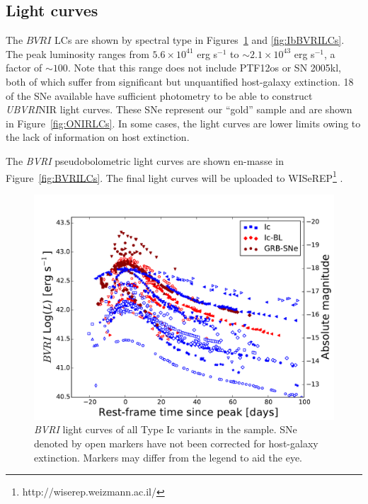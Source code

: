 \documentclass[a4paper,fleqn,usenatbib]{mnras}
\begin{document}
\subsection{Light curves}
The $BVRI$ LCs are shown by spectral type in Figures~\ref{fig:IcBVRILCs} and \ref{fig:IbBVRILCs}. The peak luminosity ranges from $5.6\times10^{41}$ erg s$^{-1}$ to $\sim 2.1 \times10^{43}$ erg s$^{-1}$, a factor of $\sim 100$. Note that this range does not include PTF12os or SN 2005kl, both of which suffer from significant but unquantified host-galaxy extinction. 18 of the SNe available have sufficient photometry to be able to construct \textit{UBVRI}NIR light curves. These SNe represent our ``gold'' sample and are shown in Figure~\ref{fig:ONIRLCs}. In some cases, the light curves are lower limits owing to the lack of information on host extinction. 

The \textit{BVRI} pseudobolometric light curves are shown en-masse in Figure~\ref{fig:BVRILCs}.
The final light curves will be uploaded to WISeREP\footnote{http://wiserep.weizmann.ac.il/} \citep{Yaron2012}.

\begin{figure}
\centering
\includegraphics[scale=0.4]{BVRI_all_Ic_Bolometric_LCs.pdf}
\caption{\textit{BVRI} light curves of all Type Ic variants in the sample. SNe denoted by open markers have not been corrected for host-galaxy extinction. Markers may differ from the legend to aid the eye.}
\label{fig:IcBVRILCs}
\end{figure}
\end{document}
